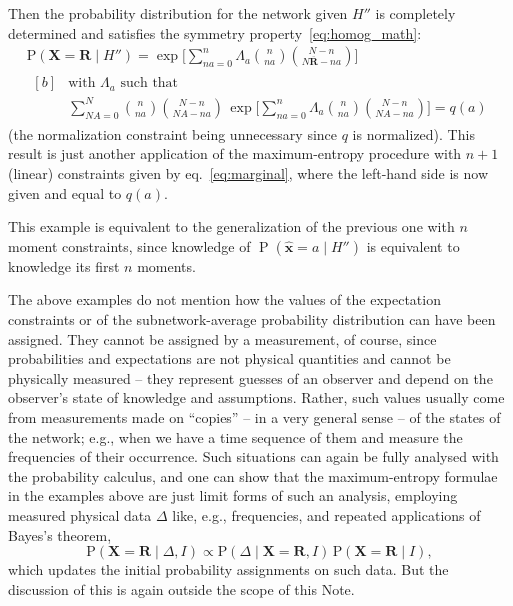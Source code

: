 \documentclass{article}
\newcommand*{\citep}{\parencites}
\theoremstyle{innote}
\newcommand*{\av}{\overline} %
\newcommand*{\sav}{\widehat} %
\newcommand*{\yx}{\bm{x}}%
\newcommand*{\yxs}{\sav{\yx}}%
\newcommand*{\yX}{\bm{X}}%
\newcommand*{\yXf}{\av{\yX}}%
\newcommand*{\yR}{\bm{R}}%
\newcommand*{\yRf}{\av{\yR}}%
\newcommand*{\yHb}{\varEta''}
\newcommand*{\yL}{\varLambda}
\newcommand*{\eg}{{e.g.}}
\newcommand*{\cond}%
{\mathpunct{|}}%
\DeclareMathOperator{\pr}{P}%
\newcommand*{\p}{\mathrm{P}}%
\renewcommand*{\|}{\cond}
\newcommand*{\+}{\lor}
\newcommand*{\eqn}{eq.}%
\let\varEta H
\let\varIota I
\begin{document}
\medskip Then the probability distribution for the network given $\yHb$ is
completely determined and satisfies the symmetry
property~\eqref{eq:homog_math}:
\begin{multline}
  \label{eq:pop_distr_maxent2}
  \p(\yX= \yR \cond\yHb) =
\exp\Biggl[
\sum_{n a=0}^n \yL_{ a}
\binom{n}{n a}
\binom{N-n}{N\yRf-n a}\Biggr]
\\
\!\begin{aligned}[b]
&\text{with $\yL_{ a}$ such that}
\\
&\sum_{N A=0}^N
\binom{n}{n a}
\binom{N-n}{N A-n a}\,
\exp\Biggl[
\sum_{n a=0}^n \yL_{ a}
\binom{n}{n a}
\binom{N-n}{N A-n a}\Biggr]
=q( a)
\end{aligned}
\end{multline}
(the normalization constraint being unnecessary since $q$ is normalized).
This result is just another application of the maximum-entropy procedure
with $n+1$ (linear) constraints given by \eqn~\eqref{eq:marginal}, where
the left-hand side is now given and equal to $q(a)$.

This example is equivalent to the generalization of the previous one with
$n$ moment constraints, since knowledge of $\pr(\yxs=a \cond \yHb)$ is
equivalent to knowledge its first $n$ moments.

\bigskip

The above examples do not mention how the values of the expectation
constraints or of the subnetwork-average probability distribution can have
been assigned. They cannot be assigned by a measurement, of course, since
probabilities and expectations are not physical quantities and cannot be
physically measured -- they represent guesses of an observer and depend on
the observer's state of knowledge and assumptions. Rather, such values
usually come from measurements made on \enquote{copies} -- in a very
general sense -- of the states of the network; \eg, when we have a time
sequence of them and measure the frequencies of their occurrence. Such
situations can again be fully analysed with the probability calculus, and
one can show \citep{portamana2009} that the maximum-entropy formulae in the
examples above are just limit forms of such an analysis, employing
measured physical data $\varDelta$ like, \eg, frequencies, and
repeated applications of Bayes's theorem,
\begin{equation}
  \label{eq:bayes_thm}
  \p(\yX =\yR\cond \varDelta, \varIota) \propto
\p(\varDelta \cond \yX=\yR, \varIota)\, \p(\yX =\yR \cond \varIota),
\end{equation}
which updates the initial probability assignments on such data. But the
discussion of this is again outside the scope of this Note.
\end{document}
